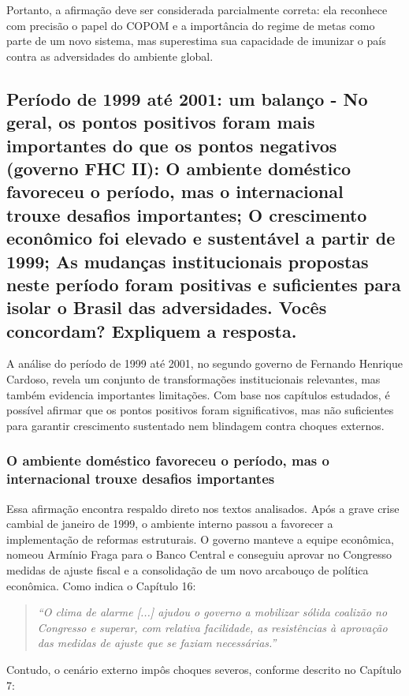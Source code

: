 \documentclass[a4paper,12pt]{article}[abntex2]
\begin{document}
Portanto, a afirmação deve ser considerada parcialmente correta: ela reconhece com precisão o papel do COPOM e a importância do regime de metas como parte de um novo sistema, mas superestima sua capacidade de imunizar o país contra as adversidades do ambiente global.

\subsection{\textbf{Período de 1999 até 2001: um balanço - No geral, os pontos positivos foram mais importantes do que os pontos negativos (governo FHC II): O ambiente doméstico favoreceu o período, mas o internacional trouxe desafios importantes; O crescimento econômico foi elevado e sustentável a partir de 1999; As mudanças institucionais propostas neste período foram positivas e suficientes para isolar o Brasil das adversidades. Vocês concordam? Expliquem a resposta.}}

A análise do período de 1999 até 2001, no segundo governo de Fernando Henrique Cardoso, revela um conjunto de transformações institucionais relevantes, mas também evidencia importantes limitações. Com base nos capítulos estudados, é possível afirmar que os pontos positivos foram significativos, mas não suficientes para garantir crescimento sustentado nem blindagem contra choques externos.

\subsubsection{\textbf{O ambiente doméstico favoreceu o período, mas o internacional trouxe desafios importantes}}

Essa afirmação encontra respaldo direto nos textos analisados. Após a grave crise cambial de janeiro de 1999, o ambiente interno passou a favorecer a implementação de reformas estruturais. O governo manteve a equipe econômica, nomeou Armínio Fraga para o Banco Central e conseguiu aprovar no Congresso medidas de ajuste fiscal e a consolidação de um novo arcabouço de política econômica. Como indica o Capítulo 16:

\begin{quote}
\textit{“O clima de alarme [...] ajudou o governo a mobilizar sólida coalizão no Congresso e superar, com relativa facilidade, as resistências à aprovação das medidas de ajuste que se faziam necessárias.”}
\end{quote}

Contudo, o cenário externo impôs choques severos, conforme descrito no Capítulo 7:
\end{document}

